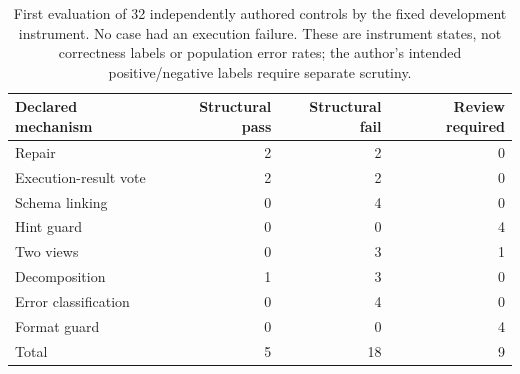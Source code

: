 \begin{table}[h]
\centering\small
\begin{tabular}{lrrr}\toprule
Declared mechanism & Structural pass & Structural fail & Review required \\\midrule
Repair & 2 & 2 & 0 \\
Execution-result vote & 2 & 2 & 0 \\
Schema linking & 0 & 4 & 0 \\
Hint guard & 0 & 0 & 4 \\
Two views & 0 & 3 & 1 \\
Decomposition & 1 & 3 & 0 \\
Error classification & 0 & 4 & 0 \\
Format guard & 0 & 0 & 4 \\\midrule
Total & 5 & 18 & 9 \\\bottomrule
\end{tabular}
\caption{First evaluation of 32 independently authored controls by the
fixed development instrument. No case had an execution failure. These
are instrument states, not correctness labels or population error rates;
the author's intended positive/negative labels require separate scrutiny.}
\label{tab:gatecontrols}
\end{table}

